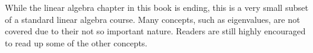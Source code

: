 \begin{remark}
  While the linear algebra chapter in this book is ending, this is a very small subset of a standard linear algebra course. Many concepts, such as eigenvalues, are not covered due to their not so important nature. Readers are still highly encouraged to read up some of the other concepts.
\end{remark}
